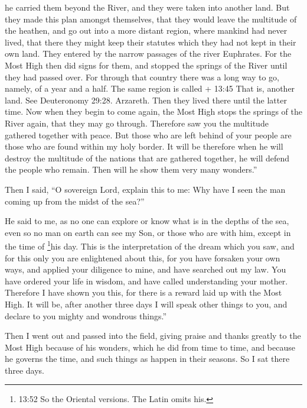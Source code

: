 he carried them beyond the River, and they were taken into another land.
 But they made this plan amongst themselves, that they
would leave the multitude of the heathen, and go out into a more distant
region, where mankind had never lived,  that there they
might keep their statutes which they had not kept in their own land.
 They entered by the narrow passages of the river
Euphrates.  For the Most High then did signs for them, and
stopped the springs of the River until they had passed over.
 For through that country there was a long way to go,
namely, of a year and a half. The same region is called + 13:45 That is,
another land. See Deuteronomy 29:28. Arzareth.  Then they
lived there until the latter time. Now when they begin to come again,
 the Most High stops the springs of the River again, that
they may go through. Therefore saw you the multitude gathered together
with peace.  But those who are left behind of your people
are those who are found within my holy border.  It will be
therefore when he will destroy the multitude of the nations that are
gathered together, he will defend the people who remain. 
Then will he show them very many wonders.''

 Then I said, ``O sovereign Lord, explain this to me: Why
have I seen the man coming up from the midst of the sea?''

 He said to me, as no one can explore or know what is in
the depths of the sea, even so no man on earth can see my Son, or those
who are with him, except in the time of \footnote{13:52 So the Oriental
  versions. The Latin omits his.}his day.  This is the
interpretation of the dream which you saw, and for this only you are
enlightened about this,  for you have forsaken your own
ways, and applied your diligence to mine, and have searched out my law.
 You have ordered your life in wisdom, and have called
understanding your mother.  Therefore I have shown you
this, for there is a reward laid up with the Most High. It will be,
after another three days I will speak other things to you, and declare
to you mighty and wondrous things.''

 Then I went out and passed into the field, giving praise
and thanks greatly to the Most High because of his wonders, which he did
from time to time,  and because he governs the time, and
such things as happen in their seasons. So I sat there three days.

